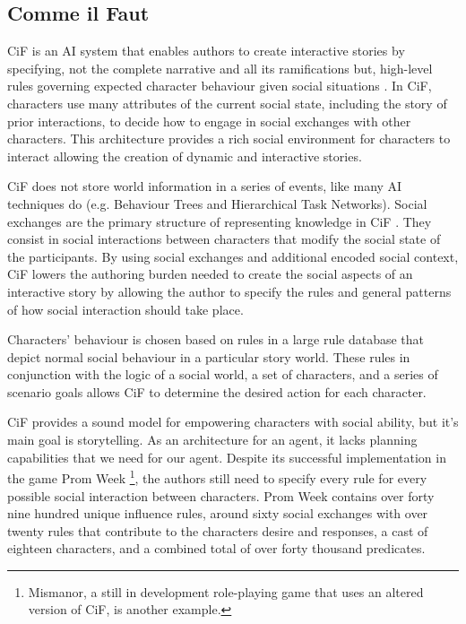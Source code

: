 \subsection{Comme il Faut}
\label{sec:cif}
\ac{CiF} is an \ac{AI} system that enables authors to create interactive stories by specifying, not the complete narrative and all its ramifications but, high-level rules governing expected character behaviour given social situations \cite{mccoy:cif-social-story-worlds}.
In \ac{CiF}, characters use many attributes of the current social state, including the story of prior interactions, to decide how to engage in social exchanges with other characters.
This architecture provides a rich social environment for characters to interact allowing the creation of dynamic and interactive stories.

\ac{CiF} does not store world information in a series of events, like many \ac{AI} techniques do (e.g. Behaviour Trees and Hierarchical Task Networks).
Social exchanges are the primary structure of representing knowledge in \ac{CiF} \cite{mccoy:cif-authoring}.
They consist in social interactions between characters that modify the social state of the participants.
By using social exchanges and additional encoded social context, \ac{CiF} lowers the authoring burden needed to create the social aspects of an interactive story by allowing the author to specify the rules and general patterns of how social interaction should take place.

Characters' behaviour is chosen based on rules in a large rule database that depict normal social behaviour in a particular story world.
These rules in conjunction with the logic of a social world, a set of characters, and a series of scenario goals allows \ac{CiF} to determine the desired action for each character.

\ac{CiF} provides a sound model for empowering characters with social ability, but it's main goal is storytelling.
As an architecture for an agent, it lacks planning capabilities that we need for our agent.
Despite its successful implementation in the game Prom Week \cite{mccoy:prom-week} \footnote{Mismanor, a still in development role-playing game that uses an altered version of \ac{CiF}, is another example.}, the authors still need to specify every rule for every possible social interaction between characters. Prom Week contains over forty nine hundred unique influence rules, around sixty social exchanges with over twenty rules that contribute to the characters desire and responses, a cast of eighteen characters, and a combined total of over forty thousand predicates.